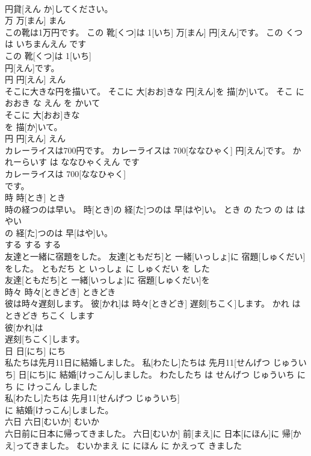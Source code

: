 \documentclass[8pt]{extreport}
\begin{document}
\begin{CJK}{UTF8}{min}
\\	円貸[えん か]してください。			
\\	万	万[まん]	まん	
\\	この靴は1万円です。	この 靴[くつ]は 1[いち] 万[まん] 円[えん]です。	この くつ は いちまんえん です	
\\	この 靴[くつ]は 1[いち]
\\	円[えん]です。			
\\	円	円[えん]	えん	
\\	そこに大きな円を描いて。	そこに 大[おお]きな 円[えん]を 描[か]いて。	そこ に おおき な えん を かいて	
\\	そこに 大[おお]きな
\\	を 描[か]いて。			
\\	円	円[えん]	えん	
\\	カレーライスは700円です。	カレーライスは 700[ななひゃく] 円[えん]です。	かれーらいす は ななひゃくえん です	
\\	カレーライスは 700[ななひゃく]
\\	です。			
\\	時	時[とき]	とき	
\\	時の経つのは早い。	時[とき]の 経[た]つのは 早[はや]い。	とき の たつ の は はやい	
\\	の 経[た]つのは 早[はや]い。			
\\	する	する	する	
\\	友達と一緒に宿題をした。	友達[ともだち]と 一緒[いっしょ]に 宿題[しゅくだい]をした。	ともだち と いっしょ に しゅくだい を した	
\\	友達[ともだち]と 一緒[いっしょ]に 宿題[しゅくだい]を
\\	時々	時々[ときどき]	ときどき	
\\	彼は時々遅刻します。	彼[かれ]は 時々[ときどき] 遅刻[ちこく]します。	かれ は ときどき ちこく します	
\\	彼[かれ]は
\\	遅刻[ちこく]します。			
\\	日	日[にち]	にち	
\\	私たちは先月11日に結婚しました。	私[わたし]たちは 先月11[せんげつ じゅういち] 日[にち]に 結婚[けっこん]しました。	わたしたち は せんげつ じゅういち にち に けっこん しました	
\\	私[わたし]たちは 先月11[せんげつ じゅういち]
\\	に 結婚[けっこん]しました。			
\\	六日	六日[むいか]	むいか	
\\	六日前に日本に帰ってきました。	六日[むいか] 前[まえ]に 日本[にほん]に 帰[かえ]ってきました。	むいかまえ に にほん に かえって きました	

\end{CJK}
\end{document}

